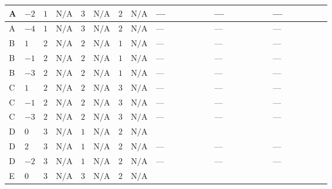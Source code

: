 \documentclass[8pt]{article}
\begin{document}
\begin{landscape}
\begin{longtable}{@{}llcccccc >{\raggedright\arraybackslash}p{0.21\linewidth} >{\raggedright\arraybackslash}p{0.21\linewidth} >{\raggedright\arraybackslash}p{0.21\linewidth}@{}}
\midrule
A & $-2$ & $1$ & $\text{N/A}$ & $3$ & $\text{N/A}$ & $2$ & $\text{N/A}$ & --- & --- & --- \\
\midrule
A & $-4$ & $1$ & $\text{N/A}$ & $3$ & $\text{N/A}$ & $2$ & $\text{N/A}$ & --- & --- & --- \\
\midrule
B & $1$ & $2$ & $\text{N/A}$ & $2$ & $\text{N/A}$ & $1$ & $\text{N/A}$ & --- & --- & --- \\
\midrule
B & $-1$ & $2$ & $\text{N/A}$ & $2$ & $\text{N/A}$ & $1$ & $\text{N/A}$ & --- & --- & --- \\
\midrule
B & $-3$ & $2$ & $\text{N/A}$ & $2$ & $\text{N/A}$ & $1$ & $\text{N/A}$ & --- & --- & --- \\
\midrule
C & $1$ & $2$ & $\text{N/A}$ & $2$ & $\text{N/A}$ & $3$ & $\text{N/A}$ & --- & --- & --- \\
\midrule
C & $-1$ & $2$ & $\text{N/A}$ & $2$ & $\text{N/A}$ & $3$ & $\text{N/A}$ & --- & --- & --- \\
\midrule
C & $-3$ & $2$ & $\text{N/A}$ & $2$ & $\text{N/A}$ & $3$ & $\text{N/A}$ & --- & --- & --- \\
\midrule
D & $0$ & $3$ & $\text{N/A}$ & $1$ & $\text{N/A}$ & $2$ & $\text{N/A}$ & \scriptsize\adjustbox{max width=\linewidth}{$\begin{gathered} -\frac{9 {g_1}^2 {\lambda_{X_{14}}}}{2}\end{gathered}$} & \scriptsize\adjustbox{max width=\linewidth}{$\begin{gathered} +2 {\lambda_{12}^{(1)}} {\lambda_{X_{14}}}\end{gathered}$} & \scriptsize\adjustbox{max width=\linewidth}{$\begin{gathered} +2 {\lambda_1} {\lambda_{X_{14}}}\end{gathered}$} \\
\midrule
D & $2$ & $3$ & $\text{N/A}$ & $1$ & $\text{N/A}$ & $2$ & $\text{N/A}$ & --- & --- & --- \\
\midrule
D & $-2$ & $3$ & $\text{N/A}$ & $1$ & $\text{N/A}$ & $2$ & $\text{N/A}$ & --- & --- & --- \\
\midrule
E & $0$ & $3$ & $\text{N/A}$ & $3$ & $\text{N/A}$ & $2$ & $\text{N/A}$ & \scriptsize\adjustbox{max width=\linewidth}{$\begin{gathered} -\frac{9 {g_1}^2 {\lambda_{X_{14}}}}{2}\end{gathered}$} & \scriptsize\adjustbox{max width=\linewidth}{$\begin{gathered} +2 {\lambda_{12}^{(1)}} {\lambda_{X_{14}}}\end{gathered}$} & \scriptsize\adjustbox{max width=\linewidth}{$\begin{gathered} +2 {\lambda_1} {\lambda_{X_{14}}}\end{gathered}$} \\

\end{longtable}
\end{landscape}
\end{document}
